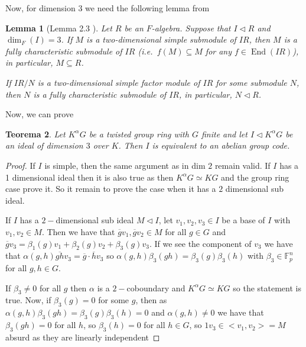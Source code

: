\documentclass{article}
\newtheorem{theorem}{Teorema}
\newtheorem{lemma}[theorem]{Lemma}
\begin{document}
Now, for dimension $3$ we need the following lemma from \cite{GARCIAPILLADO2019167}

\begin{lemma}[Lemma 2.3 \cite{GARCIAPILLADO2019167}]
    Let \( R \) be an \( F \)-algebra. Suppose that \( I \triangleleft R \) and
\(\dim_F(I) = 3\). If \( M \) is a two-dimensional simple submodule of \( IR \),
then \( M \) is a fully characteristic submodule of \( IR \)
(i.e.\ \( f(M) \subseteq M \) for any \( f \in \operatorname{End}(IR) \)),
in particular, \( M \subseteq R \).

If \( IR/N \) is a two-dimensional simple factor module of \( IR \) for some
submodule \( N \), then \( N \) is a fully characteristic submodule of \( IR \),
in particular, \( N \triangleleft R \).

\end{lemma}

Now, we can prove

\begin{theorem}
    Let $K^\alpha G$ be a twisted group ring with $G$ finite and let $I\triangleleft K^\alpha G$ be an ideal of dimension $3$ over $K$. Then $I$ is equivalent to an abelian group code. 
\end{theorem} 
\begin{proof}
    If $I$ is simple, then the same argument as in dim $2$ remain valid. If $I$ has a 1 dimensional ideal then it is also true as then $K^\alpha G \simeq KG$ and the group ring case prove it. So it remain to prove the case when it has a $2$ dimensional sub ideal.  

    If $I$ has a $2-$dimensional sub ideal $M \triangleleft I$, let $v_1,v_2,v_3 \in I$ be a base of $I$ with $v_1,v_2 \in M$. Then we have that $\overline{g} v_1,\overline{g} v_2 \in M $ for all $g\in G$ and $\overline{g} v_3 = \beta_1(g) v_1 + \beta_2(g) v_2 + \beta_3(g) v_3$. If we see the component of $v_3$ we have that $\alpha(g,h)\overline{gh} v_3 = \overline{g} \cdot \overline{h} v_3$ so $\alpha(g,h) \beta_3(gh) =  \beta_3(g)  \beta_3(h)$ with $\beta_3 \in \mathbb{F}_p^n$ for all $g,h \in G$. 

    If $\beta_3 \not = 0 $ for all $g$ then $\alpha$ is a $2-$coboundary and $K^\alpha G \simeq KG$ so the statement is true. Now, if $\beta_3(g) =0$ for some $g$, then as $\alpha(g,h) \beta_3(gh) =  \beta_3(g)  \beta_3(h) = 0$ and $\alpha(g,h)\not = 0$ we have that $\beta_3(gh)=0$ for all $h$, so $\beta_3(h) =0$ for all $h\in G$, so $1v_3 \in <v_1,v_2> = M$ absurd as they are linearly independent
\end{proof}
\end{document}
